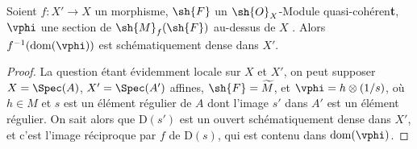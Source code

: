 \begin{proposition}[20.2.15]
\label{IV.20.2.15}
Soient $f:X'\to X$ un morphisme, $\sh{F}$ un $\sh{O}_X$-Module quasi-cohéren\textbf{t}, $\vphi$ une section de $\sh{M}_f(\sh{F})$ au-dessus de $X$ .
Alors $f^{-1}(\operatorname{dom}(\vphi))$ est schématiquement dense dans $X'$.
\end{proposition}

\begin{proof}
La question étant évidemment locale sur $X$ et $X'$, on peut supposer $X=\Spec(A)$, $X'=\Spec(A')$ affines, $\sh{F}=\widetilde{M}$, et $\vphi=h\otimes(1/s)$, où $h\in M$ et $s$ est un élément régulier de $A$ dont l'image $s'$ dans $A'$ est un élément régulier.
On sait alors  que $\mathrm{D}(s')$ est un ouvert schématiquement dense dans $X'$, et c'est l'image réciproque par $f$ de $\mathrm{D}(s)$, qui est contenu dans $\operatorname{dom}(\vphi)$.
\end{proof}

